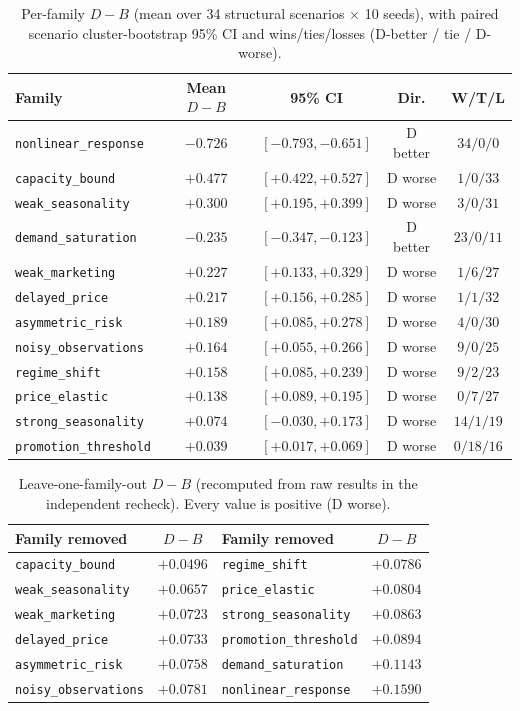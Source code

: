\documentclass[conference]{IEEEtran}
\newcommand{\code}[1]{\texttt{#1}}
\newcommand{\dvb}{\ensuremath{D\!-\!B}}
\begin{document}
\begin{table}[!t]
\caption{Per-family $\dvb$ (mean over 34 structural scenarios $\times$ 10 seeds),
with paired scenario cluster-bootstrap 95\% CI and wins/ties/losses
(D-better / tie / D-worse).}
\label{tab:family}
\centering
\begin{tabular}{lcccc}
\toprule
Family & Mean \dvb & 95\% CI & Dir. & W/T/L \\
\midrule
\code{nonlinear\_response}  & $-0.726$ & $[-0.793,-0.651]$ & D better & $34/0/0$ \\
\code{capacity\_bound}      & $+0.477$ & $[+0.422,+0.527]$ & D worse  & $1/0/33$ \\
\code{weak\_seasonality}    & $+0.300$ & $[+0.195,+0.399]$ & D worse  & $3/0/31$ \\
\code{demand\_saturation}   & $-0.235$ & $[-0.347,-0.123]$ & D better & $23/0/11$ \\
\code{weak\_marketing}      & $+0.227$ & $[+0.133,+0.329]$ & D worse  & $1/6/27$ \\
\code{delayed\_price}       & $+0.217$ & $[+0.156,+0.285]$ & D worse  & $1/1/32$ \\
\code{asymmetric\_risk}     & $+0.189$ & $[+0.085,+0.278]$ & D worse  & $4/0/30$ \\
\code{noisy\_observations}  & $+0.164$ & $[+0.055,+0.266]$ & D worse  & $9/0/25$ \\
\code{regime\_shift}        & $+0.158$ & $[+0.085,+0.239]$ & D worse  & $9/2/23$ \\
\code{price\_elastic}       & $+0.138$ & $[+0.089,+0.195]$ & D worse  & $0/7/27$ \\
\code{strong\_seasonality}  & $+0.074$ & $[-0.030,+0.173]$ & D worse  & $14/1/19$ \\
\code{promotion\_threshold} & $+0.039$ & $[+0.017,+0.069]$ & D worse  & $0/18/16$ \\
\bottomrule
\end{tabular}
\end{table}

\begin{table}[!t]
\caption{Leave-one-family-out $\dvb$ (recomputed from raw results in the
independent recheck). Every value is positive (D worse).}
\label{tab:lofo}
\centering
\begin{tabular}{lc|lc}
\toprule
Family removed & \dvb & Family removed & \dvb \\
\midrule
\code{capacity\_bound}     & $+0.0496$ & \code{regime\_shift}      & $+0.0786$ \\
\code{weak\_seasonality}   & $+0.0657$ & \code{price\_elastic}     & $+0.0804$ \\
\code{weak\_marketing}     & $+0.0723$ & \code{strong\_seasonality}& $+0.0863$ \\
\code{delayed\_price}      & $+0.0733$ & \code{promotion\_threshold}& $+0.0894$ \\
\code{asymmetric\_risk}    & $+0.0758$ & \code{demand\_saturation} & $+0.1143$ \\
\code{noisy\_observations} & $+0.0781$ & \code{nonlinear\_response}& $+0.1590$ \\
\bottomrule
\end{tabular}
\end{table}
\end{document}
